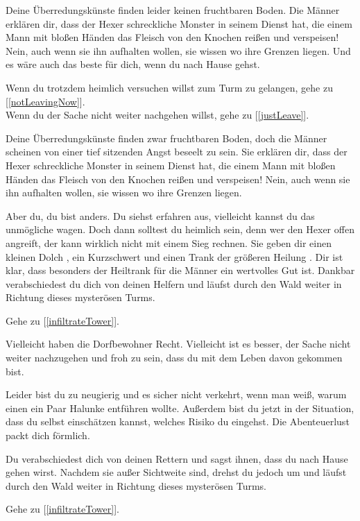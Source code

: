 
Deine Überredungskünste finden leider keinen fruchtbaren Boden. Die Männer erklären dir, dass der Hexer schreckliche Monster in seinem Dienst hat, die einem Mann mit bloßen Händen das Fleisch von den Knochen reißen und verspeisen! Nein, auch wenn sie ihn aufhalten wollen, sie wissen wo ihre Grenzen liegen. Und es wäre auch das beste für dich, wenn du nach Hause gehst.

Wenn du trotzdem heimlich versuchen willst zum Turm zu gelangen, gehe zu [\ref{notLeavingNow}].
\\Wenn du der Sache nicht weiter nachgehen willst, gehe zu [\ref{justLeave}].


Deine Überredungskünste finden zwar fruchtbaren Boden, doch die Männer scheinen von einer tief sitzenden Angst beseelt zu sein. Sie erklären dir, dass der Hexer schreckliche Monster in seinem Dienst hat, die einem Mann mit bloßen Händen das Fleisch von den Knochen reißen und verspeisen! Nein, auch wenn sie ihn aufhalten wollen, sie wissen wo ihre Grenzen liegen.

Aber du, du bist anders. Du siehst erfahren aus, vielleicht kannst du das unmögliche wagen. Doch dann solltest du heimlich sein, denn wer den Hexer offen angreift, der kann wirklich nicht mit einem Sieg rechnen. Sie geben dir einen kleinen Dolch , ein Kurzschwert  und einen Trank der größeren Heilung . Dir ist klar, dass besonders der Heiltrank für die Männer ein wertvolles Gut ist. Dankbar verabschiedest du dich von deinen Helfern und läufst durch den Wald weiter in Richtung dieses mysterösen Turms.

Gehe zu [\ref{infiltrateTower}].


Vielleicht haben die Dorfbewohner Recht. Vielleicht ist es besser, der Sache nicht weiter nachzugehen und froh zu sein, dass du mit dem Leben davon gekommen bist.

Leider bist du zu neugierig und es sicher nicht verkehrt, wenn man weiß, warum einen ein Paar Halunke entführen wollte. Außerdem bist du jetzt in der Situation, dass du selbst einschätzen kannst, welches Risiko du eingehst. Die Abenteuerlust packt dich förmlich.

Du verabschiedest dich von deinen Rettern und sagst ihnen, dass du nach Hause gehen wirst. Nachdem sie außer Sichtweite sind, drehst du jedoch um und läufst durch den Wald weiter in Richtung dieses mysterösen Turms.

Gehe zu [\ref{infiltrateTower}].
